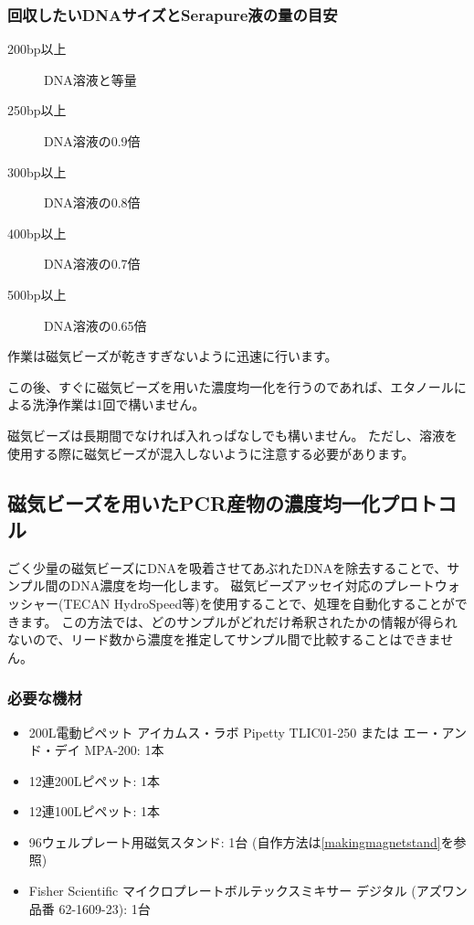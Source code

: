 \documentclass[titlepage,10pt,a4paper,uplatex]{jsbook}
\begin{document}
\subsubsection{回収したいDNAサイズとSerapure液の量の目安}
\begin{description}
\item[200bp以上] DNA溶液と等量
\item[250bp以上] DNA溶液の0.9倍
\item[300bp以上] DNA溶液の0.8倍
\item[400bp以上] DNA溶液の0.7倍
\item[500bp以上] DNA溶液の0.65倍
\end{description}

作業は磁気ビーズが乾きすぎないように迅速に行います。

この後、すぐに磁気ビーズを用いた濃度均一化を行うのであれば、エタノールによる洗浄作業は1回で構いません。

磁気ビーズは長期間でなければ入れっぱなしでも構いません。
ただし、溶液を使用する際に磁気ビーズが混入しないように注意する必要があります。

\subsection{磁気ビーズを用いたPCR産物の濃度均一化プロトコル}

ごく少量の磁気ビーズにDNAを吸着させてあぶれたDNAを除去することで、サンプル間のDNA濃度を均一化します。
磁気ビーズアッセイ対応のプレートウォッシャー(TECAN HydroSpeed等)を使用することで、処理を自動化することができます。
この方法では、どのサンプルがどれだけ希釈されたかの情報が得られないので、リード数から濃度を推定してサンプル間で比較することはできません。

\subsubsection{必要な機材}
\begin{itemize}
\item 200{\textmu}L電動ピペット アイカムス・ラボ Pipetty TLIC01-250 または エー・アンド・デイ MPA-200: 1本
\item 12連200{\textmu}Lピペット: 1本
\item 12連100{\textmu}Lピペット: 1本
\item 96ウェルプレート用磁気スタンド: 1台 (自作方法は\ref{makingmagnetstand}を参照)
\item Fisher Scientific マイクロプレートボルテックスミキサー デジタル (アズワン品番 62-1609-23): 1台
\end{itemize}
\end{document}
